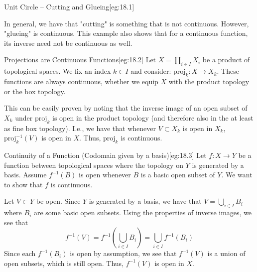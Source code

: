 \begin{egBox}{Unit Circle -- Cutting and Glueing}[eg:18.1]
    \baseSkip

    In general, we have that "cutting" is something that is not continuous.
    However, "glueing" is continuous.
    This example also shows that for a continuous function, its inverse 
    need not be continuous as well.
\end{egBox}

\begin{egBox}{Projections are Continuous Functions}[eg:18.2]
    Let \( X = \prod_{ i \in I } X_{ i } \) be a product of topological spaces.
    We fix an index \( k \in I \) and consider: \( \mathrm{proj}_{ k }: X \rightarrow X_{ k } \). 
    These functions are always continuous, whether we equip \( X \) with the 
    product topology or the box topology.

    \baseSkip

    This can be easily proven by noting that the inverse image of an open 
    subset of \( X_{ k } \) under 
    \( \mathrm{proj}_{ k } \) is open in the product topology (and therefore
    also in the at least as fine box topology).
    I.e., we have that whenever \( V \subset X_{ k } \) is open in 
    \( X_{ k } \), \( \mathrm{proj}_{ k }^{ -1 } ( V ) \) is open in \( X \).
    Thus, \( \mathrm{proj}_{ k } \) is continuous.
\end{egBox}

\begin{egBox}{Continuity of a Function (Codomain given by a basis)}[eg:18.3]
    Let \( f: X \rightarrow Y \) be a function between topological spaces where the topology on \( Y \) is generated by a basis. 
    Assume \( f^{ -1 } ( B ) \) is open whenever \( B \) is a basic open subset 
    of \( Y \).
    We want to show that \( f \) is continuous.

    \baseSkip

    Let \( V \subset Y \) be open.
    Since \( Y \) is generated by a basis, we have that \( V = 
    \bigcup_{ i \in  I } B_{ i } \) where \( B_{ i } \) are some basic open subsets.
    Using the properties of inverse images, we see that 
    \begin{equation*}
        f^{ -1 } ( V )
        =
        f^{ -1 } \left( \bigcup _{ i \in I } B_{ i } \right)
        =
        \bigcup _{ i \in I } f^{ -1 } ( B_{ i } )
    \end{equation*}
    Since each \( f^{ -1 } ( B_{ i } ) \) is open by assumption, we see that 
    \( f^{ -1 } ( V ) \) is a union of open subsets, which is still open.
    Thus, \( f^{ -1 } ( V ) \) is open in \( X \).
\end{egBox}

